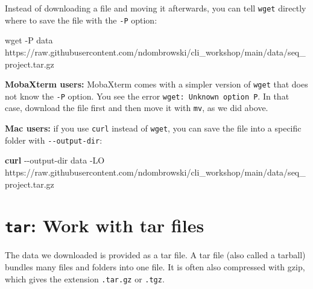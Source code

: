 \documentclass[
  letterpaper,
  DIV=11,
  numbers=noendperiod]{scrreprt}
\newenvironment{Shaded}{}{}
\newcommand{\AttributeTok}[1]{\textcolor[rgb]{0.84,0.23,0.29}{#1}}
\newcommand{\ExtensionTok}[1]{\textcolor[rgb]{0.84,0.23,0.29}{\textbf{#1}}}
\newcommand{\FunctionTok}[1]{\textcolor[rgb]{0.44,0.26,0.76}{#1}}
\newcommand{\NormalTok}[1]{\textcolor[rgb]{0.14,0.16,0.18}{#1}}
\begin{document}
\begin{tcolorbox}[enhanced jigsaw, coltitle=black, breakable, titlerule=0mm, colback=white, rightrule=.15mm, bottomrule=.15mm, toprule=.15mm, colframe=quarto-callout-tip-color-frame, colbacktitle=quarto-callout-tip-color!10!white, bottomtitle=1mm, opacitybacktitle=0.6, toptitle=1mm, leftrule=.75mm, arc=.35mm, title=\textcolor{quarto-callout-tip-color}{\faLightbulb}\hspace{0.5em}{Tip: Downloading directly into a folder (optional)}, left=2mm, opacityback=0]

Instead of downloading a file and moving it afterwards, you can tell
\texttt{wget} directly where to save the file with the \texttt{-P}
option:

\begin{Shaded}
\begin{Highlighting}[]
\FunctionTok{wget} \AttributeTok{{-}P}\NormalTok{ data https://raw.githubusercontent.com/ndombrowski/cli\_workshop/main/data/seq\_project.tar.gz}
\end{Highlighting}
\end{Shaded}

\textbf{MobaXterm users:} MobaXterm comes with a simpler version of
\texttt{wget} that does not know the \texttt{-P} option. You see the
error \texttt{wget:\ Unknown\ option\ P}. In that case, download the
file first and then move it with \texttt{mv}, as we did above.

\textbf{Mac users:} if you use \texttt{curl} instead of \texttt{wget},
you can save the file into a specific folder with
\texttt{-\/-output-dir}:

\begin{Shaded}
\begin{Highlighting}[]
\ExtensionTok{curl} \AttributeTok{{-}{-}output{-}dir}\NormalTok{ data }\AttributeTok{{-}LO}\NormalTok{ https://raw.githubusercontent.com/ndombrowski/cli\_workshop/main/data/seq\_project.tar.gz}
\end{Highlighting}
\end{Shaded}

\end{tcolorbox}

\section{\texorpdfstring{\texttt{tar}: Work with tar
files}{tar: Work with tar files}}\label{tar-work-with-tar-files}

The data we downloaded is provided as a tar file. A tar file (also
called a tarball) bundles many files and folders into one file. It is
often also compressed with gzip, which gives the extension
\texttt{.tar.gz} or \texttt{.tgz}.
\end{document}
